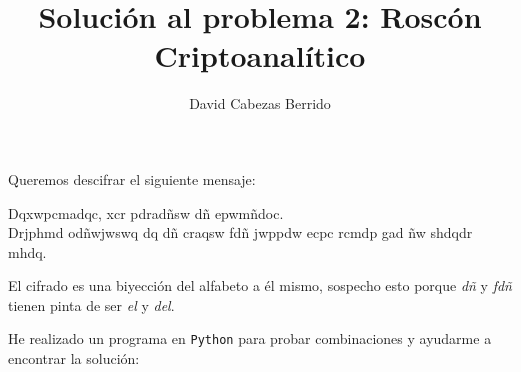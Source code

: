 \documentclass[12pt,spanish]{article}
\begin{document}
\title{Solución al problema 2: Roscón Criptoanalítico}
\author{David Cabezas Berrido}
\date{\vspace{-5mm}}
\maketitle

Queremos descifrar el siguiente mensaje:

\begin{center}
  Dqxwpcmadqc, xcr pdradñsw dñ epwmñdoc. \\
  Drjphmd odñwjwswq dq dñ craqsw fdñ jwppdw ecpc rcmdp gad ñw shdqdr mhdq.
\end{center}

El cifrado es una biyección del alfabeto a él mismo, sospecho esto
porque \textit{dñ} y \textit{fdñ} tienen pinta de ser \textit{el} y \textit{del}.

He realizado un programa en \texttt{Python} para probar combinaciones
y ayudarme a encontrar la solución:
\end{document}
